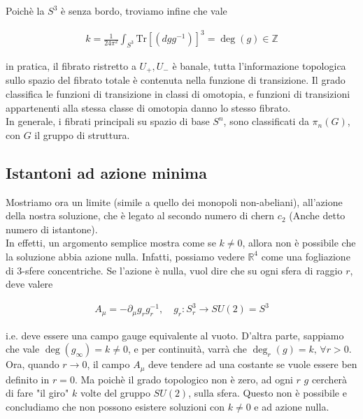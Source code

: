 \documentclass{report}
\begin{document}
Poichè la \(S^3\) è senza bordo, troviamo infine che vale 

\begin{align}
    k = \frac{1}{24\pi^2}\int_{S^3}\text{Tr}[(dgg^{-1})]^3 = \deg(g) \in \mathbb{Z}
\end{align}

in pratica, il fibrato ristretto a \(U_+, U_-\) è banale, tutta l'informazione topologica sullo spazio del fibrato totale è contenuta nella funzione di transizione. Il grado classifica le funzioni di transizione in classi di omotopia, e funzioni di transizioni appartenenti alla stessa classe di omotopia danno lo stesso fibrato. \\

In generale, i fibrati principali su spazio di base \(S^n\), sono classificati da \(\pi_n(G)\), con \(G\) il gruppo di struttura. 

\subsection{Istantoni ad azione minima}

Mostriamo ora un limite (simile a quello dei monopoli non-abeliani), all'azione della nostra soluzione, che è legato al secondo numero di chern \(c_2\) (Anche detto numero di istantone). \\

In effetti, un argomento semplice mostra come se \(k\neq 0\), allora non è possibile che la soluzione abbia azione nulla. Infatti, possiamo vedere \(\mathbb{R}^4\) come una fogliazione di 3-sfere concentriche. Se l'azione è nulla, vuol dire che su ogni sfera di raggio \(r\), deve valere 

\begin{align}
    A_\mu = -\partial_\mu g_r g_r^{-1}, \quad g_r: S^3_{r} \rightarrow SU(2) = S^3
\end{align}

i.e. deve essere una campo gauge equivalente al vuoto. D'altra parte, sappiamo che vale \(\deg(g_{\infty}) = k \neq 0\), e per continuità, varrà che \(\deg_r(g) = k, \, \forall r > 0\). \\

Ora, quando \(r \rightarrow 0\), il campo \(A_\mu\) deve tendere ad una costante se vuole essere ben definito in \(r=0\). Ma poichè il grado topologico non è zero, ad ogni \(r\) \(g\) cercherà di fare "il giro" \(k\) volte del gruppo \(SU(2)\), sulla sfera. Questo non è possibile e concludiamo che non possono esistere soluzioni con \(k \neq 0\) e ad azione nulla. \\
\end{document}
